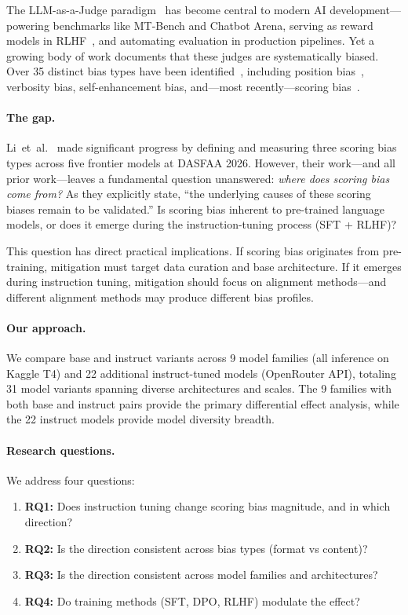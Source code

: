 \documentclass[11pt,twocolumn]{article}
\begin{document}
The LLM-as-a-Judge paradigm~\cite{zheng2023judging} has become central to modern AI development---powering benchmarks like MT-Bench and Chatbot Arena, serving as reward models in RLHF~\cite{bai2022constitutional}, and automating evaluation in production pipelines. Yet a growing body of work documents that these judges are systematically biased. Over 35 distinct bias types have been identified~\cite{ye2024justice,gu2024survey}, including position bias~\cite{wang2023large}, verbosity bias, self-enhancement bias, and---most recently---scoring bias~\cite{li2025scoring}.

\paragraph{The gap.}
Li~et~al.~\cite{li2025scoring} made significant progress by defining and measuring three scoring bias types across five frontier models at DASFAA 2026. However, their work---and all prior work---leaves a fundamental question unanswered: \emph{where does scoring bias come from?} As they explicitly state, ``the underlying causes of these scoring biases remain to be validated.'' Is scoring bias inherent to pre-trained language models, or does it emerge during the instruction-tuning process (SFT + RLHF)?

This question has direct practical implications. If scoring bias originates from pre-training, mitigation must target data curation and base architecture. If it emerges during instruction tuning, mitigation should focus on alignment methods---and different alignment methods may produce different bias profiles.

\paragraph{Our approach.}
We compare base and instruct variants across 9 model families (all inference on Kaggle T4) and 22 additional instruct-tuned models (OpenRouter API), totaling 31 model variants spanning diverse architectures and scales. The 9 families with both base and instruct pairs provide the primary differential effect analysis, while the 22 instruct models provide model diversity breadth.

\paragraph{Research questions.} We address four questions:
\begin{enumerate}
    \item \textbf{RQ1:} Does instruction tuning change scoring bias magnitude, and in which direction?
    \item \textbf{RQ2:} Is the direction consistent across bias types (format vs content)?
    \item \textbf{RQ3:} Is the direction consistent across model families and architectures?
    \item \textbf{RQ4:} Do training methods (SFT, DPO, RLHF) modulate the effect?
\end{enumerate}
\end{document}
